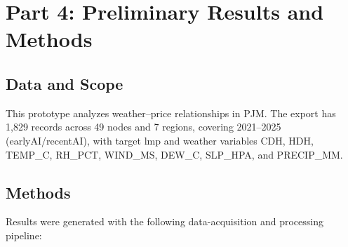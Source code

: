 \documentclass[11pt]{article}
\begin{document}
\singlespacing

\section*{Part 4: Preliminary Results and Methods}

\subsection*{Data and Scope}
This prototype analyzes weather--price relationships in PJM. The export has 1,829 records across 49 nodes and 7 regions, covering 2021--2025 (earlyAI/recentAI), with target lmp and weather variables CDH, HDH, TEMP\_C, RH\_PCT, WIND\_MS, DEW\_C, SLP\_HPA, and PRECIP\_MM.

\subsection*{Methods}
Results were generated with the following data-acquisition and processing pipeline:
\end{document}
